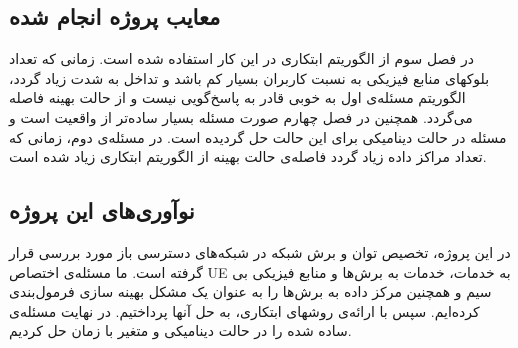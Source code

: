  \subsection{معایب  پروژه انجام شده}
 در فصل سوم از الگوریتم ابتکاری در این کار استفاده شده است. زمانی که تعداد بلوکهای منابع فیزیکی به نسبت کاربران بسیار کم باشد و تداخل به شدت زیاد گردد، الگوریتم مسئله‌ی اول به خوبی قادر به پاسخ‌گویی نیست و از حالت بهینه فاصله ‌می‌گردد. همچنین در فصل چهارم صورت مسئله بسیار ساده‌تر از واقعیت است و مسئله در حالت دینامیکی برای این حالت حل گردیده است.
 در مسئله‌ی دوم، زمانی که تعداد مراکز داده زیاد گردد فاصله‌ی حالت بهینه از الگوریتم ابتکاری زیاد شده است. 
 \subsection{نوآوری‌های این پروژه}
 در این پروژه، تخصیص توان و برش شبکه در شبکه‌های دسترسی باز مورد بررسی قرار گرفته است.
 ما مسئله‌ی اختصاص UE به خدمات، خدمات به برش‌ها و منابع فیزیکی بی سیم و همچنین مرکز داده به برش‌ها را به عنوان یک مشکل بهینه سازی فرمول‌بندی کرده‌ایم. سپس با ارائه‌ی روشهای ابتکاری، به حل آنها پرداختیم. در نهایت مسئله‌ی ساده شده را در حالت دینامیکی و متغیر با زمان حل کردیم.
